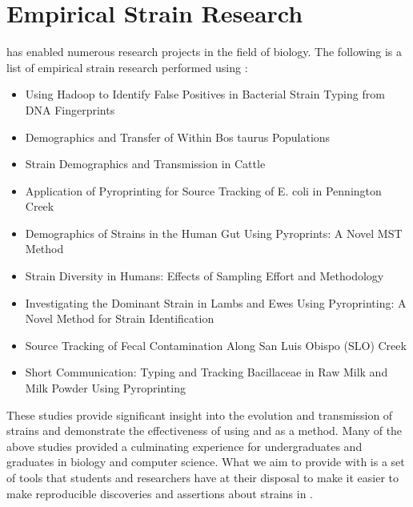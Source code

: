 \section{Empirical Strain Research}
\cplop{} has enabled numerous research projects in the field of biology.
The following is a list of empirical strain research performed using \cplop{}:
\begin{itemize}
    \item Using Hadoop to Identify False Positives in Bacterial Strain Typing from DNA Fingerprints \cite{adams2016using}
    \item Demographics and Transfer of \ecoli{} Within Bos taurus Populations \cite{dillard2015demographics}
    \item \ecoli{} Strain Demographics and Transmission in Cattle \cite{dillard2013coli}
    \item Application of Pyroprinting for Source Tracking of E. coli in Pennington Creek \cite{moritz2015application}
    \item Demographics of \ecoli{} Strains in the Human Gut Using Pyroprints:  A Novel MST Method \cite{neal2012demographics}
    \item \ecolilong{} Strain Diversity in Humans: Effects of Sampling Effort and Methodology \cite{neal2013escherichia}
    \item Investigating the Dominant \ecolilong{} Strain in Lambs and Ewes Using Pyroprinting:  A Novel Method for Strain Identification \cite{nguyeninvestigating}
    \item Source Tracking of Fecal Contamination Along San Luis Obispo (SLO) Creek \cite{shapiro2015source}
    \item Short Communication:  Typing and Tracking Bacillaceae in Raw Milk and Milk Powder Using Pyroprinting \cite{vanderkelen2016short}
\end{itemize}

These studies provide significant insight into the evolution and transmission of \ecoli{} strains and demonstrate the effectiveness of using \pyros{} and \cplop{} as a \mst{} method.
Many of the above studies provided a culminating experience for undergraduates and graduates in biology and computer science.
What we aim to provide with \krap{} is a set of tools that students and researchers have at their disposal to make it easier to make reproducible discoveries and assertions about strains in \cplop{}.

